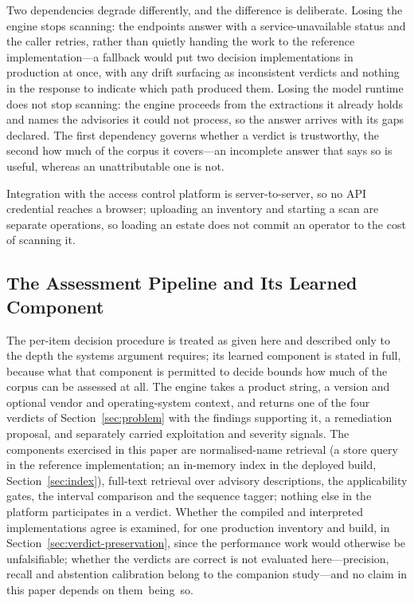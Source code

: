 \documentclass[fleqn,10pt,lineno]{wlpeerj}
\begin{document}
Two dependencies degrade differently, and the difference is deliberate. Losing the engine stops scanning: the endpoints answer with a service-unavailable status and the caller retries, rather than quietly handing the work to the reference implementation---a fallback would put two decision implementations in production at once, with any drift surfacing as inconsistent verdicts and nothing in the response to indicate which path produced them. Losing the model runtime does not stop scanning: the engine proceeds from the extractions it already holds and names the advisories it could not process, so the answer arrives with its gaps declared. The first dependency governs whether a verdict is trustworthy, the second how much of the corpus it covers---an incomplete answer that says so is useful, whereas an unattributable one is not.

Integration with the access control platform is server-to-server, so no API credential reaches a browser; uploading an inventory and starting a scan are separate operations, so loading an estate does not commit an operator to the cost of scanning it.

\subsection{The Assessment Pipeline and Its Learned Component}
\label{sec:pipeline}
The per-item decision procedure is treated as given here and described only to the depth the systems argument requires; its learned component is stated in full, because what that component is permitted to decide bounds how much of the corpus can be assessed at all. The engine takes a product string, a version and optional vendor and operating-system context, and returns one of the four verdicts of Section~\ref{sec:problem} with the findings supporting it, a remediation proposal, and separately carried exploitation and severity signals. The components exercised in this paper are normalised-name retrieval (a store query in the reference implementation; an in-memory index in the deployed build, Section~\ref{sec:index}), full-text retrieval over advisory descriptions, the applicability gates, the interval comparison and the sequence tagger; nothing else in the platform participates in a verdict. Whether the compiled and interpreted implementations agree is examined, for one production inventory and build, in Section~\ref{sec:verdict-preservation}, since the performance work would otherwise be unfalsifiable; whether the verdicts are correct is not evaluated here---precision, recall and abstention calibration belong to the companion study---and no claim in this paper depends on them~being~so.
\end{document}
